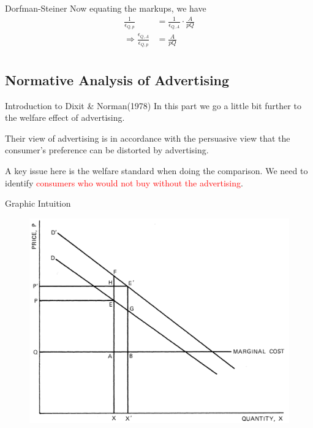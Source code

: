 \documentclass[10pt]{beamer}
\begin{document}
\begin{frame}{Dorfman-Steiner}
Now equating the markups, we have
\begin{equation}
\begin{split}
\frac{1}{\epsilon_{Q,p}} &= \frac{1}{\epsilon_{Q,A}} \cdot \frac{A}{p Q} \\
\Rightarrow \frac{\epsilon_{Q,A}}{\epsilon_{Q,p}} &= \frac{A}{p Q} \\
\end{split}
\end{equation}
\end{frame}

\subsection{Normative Analysis of Advertising}
\begin{frame}{Introduction to Dixit \& Norman(1978)}
In this part we go a little bit further to the welfare effect of advertising.

Their view of advertising is in accordance with the persuasive view that the consumer's preference can be distorted by advertising.

A key issue here is the welfare standard when doing the comparison. We need to identify \textcolor{red}{consumers who would not buy without the advertising}. 
\end{frame}

\begin{frame}{Graphic Intuition}
\begin{figure}
    \centering
    \includegraphics[width = .9\textwidth]{dixit.png}
\end{figure}
\end{frame}
\end{document}
